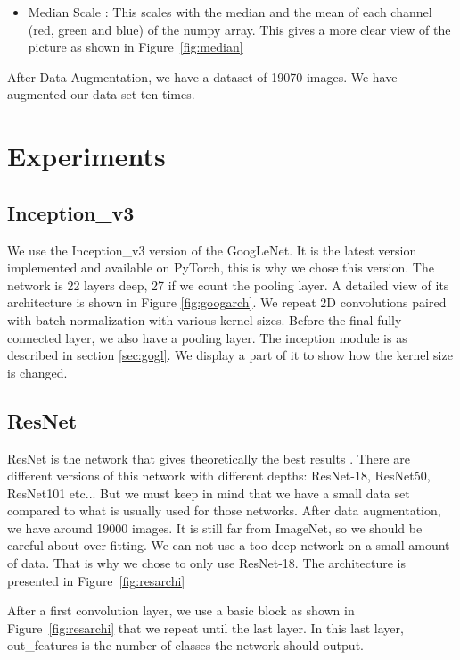 \begin{itemize}
    \item Median Scale : This scales with the median and the mean of each channel (red, green and blue) of the numpy array. This gives a more clear view of the picture as shown in Figure~\ref{fig:median}  
 \end{itemize}

After Data Augmentation, we have a dataset of 19070 images. We have augmented our data set ten times.  


\section{Experiments}
\subsection{Inception\_v3}
We use the Inception\_v3 version of the GoogLeNet. It is the latest version implemented and available on PyTorch, this is why we chose this version. The network is 22 layers deep, 27 if we count the pooling layer. A detailed view of its architecture is shown in Figure \ref{fig:googarch}.
We repeat 2D convolutions paired with batch normalization with various kernel sizes. Before the final fully connected layer, we also have a pooling layer. The inception module is as described in section \ref{sec:gogl}. We display a part of it to show how the kernel size is changed.  
\subsection{ResNet}
ResNet is the network that gives theoretically the best results \cite{resnetpaper}. There are different versions of this network with different depths: ResNet-18, ResNet50, ResNet101 etc... But we must keep in mind that we have a small data set compared to what is usually used for those networks. After data augmentation, we have around 19000 images. It is still far from ImageNet, so we should be careful about \gls{over-fitting}. We can not use a too deep network on a small amount of data. That is why we chose to only use ResNet-18. The architecture is presented in Figure~\ref{fig:resarchi}

After a first convolution layer, we use a basic block as shown in Figure~\ref{fig:resarchi} that we repeat until the last layer. In this last layer, out\_features is the number of classes the network should output. 

